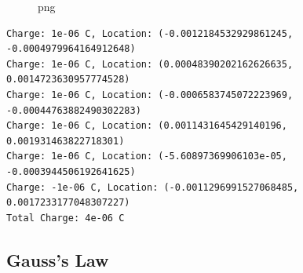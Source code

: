 \begin{Shaded}
\begin{Highlighting}[]

\OperatorTok{=} 

    \NormalTok{(}\SpecialCharTok{\{}\SpecialCharTok{\}}\SpecialCharTok{\{}\SpecialCharTok{\}}\SpecialStringTok{, }\SpecialCharTok{\{}\SpecialCharTok{\}}\NormalTok{)}
\OperatorTok{+=}
    
\NormalTok{(}\SpecialCharTok{\{}\SpecialCharTok{\}}\NormalTok{)}
\end{Highlighting}
\end{Shaded}

\begin{figure}
\centering
{}
\caption{png}
\end{figure}

\begin{verbatim}
Charge: 1e-06 C, Location: (-0.0012184532929861245, -0.0004979964164912648)
Charge: 1e-06 C, Location: (0.00048390202162626635, 0.0014723630957774528)
Charge: 1e-06 C, Location: (-0.0006583745072223969, -0.00044763882490302283)
Charge: 1e-06 C, Location: (0.0011431645429140196, 0.001931463822718301)
Charge: 1e-06 C, Location: (-5.60897369906103e-05, -0.0003944506192641625)
Charge: -1e-06 C, Location: (-0.0011296991527068485, 0.0017233177048307227)
Total Charge: 4e-06 C
\end{verbatim}

\subsection{Gauss's Law}\label{gausss-law}

